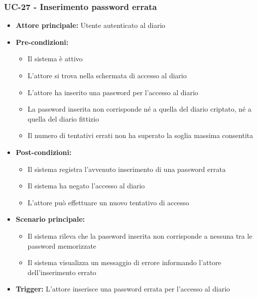 \documentclass[a4paper,12pt]{article}
\begin{document}
\subsubsection{UC-27 - Inserimento password errata} \label{subsec:UC-27}
\begin{itemize}
    \item \textbf{Attore principale:} Utente autenticato al diario
    \item \textbf{Pre-condizioni:}
    \begin{itemize}
        \item Il sistema è attivo
        \item L'attore si trova nella schermata di accesso al diario
        \item L'attore ha inserito una password per l'accesso al diario
        \item La password inserita non corrisponde né a quella del diario criptato, né a quella del diario fittizio
        \item Il numero di tentativi errati non ha superato la soglia massima consentita
    \end{itemize}
    \item \textbf{Post-condizioni:} 
    \begin{itemize}
        \item Il sistema registra l'avvenuto inserimento di una password errata
        \item Il sistema ha negato l'accesso al diario
        \item L'attore può effettuare un nuovo tentativo di accesso
    \end{itemize}
    \item \textbf{Scenario principale:} 
    \begin{itemize}
        \item Il sistema rileva che la password inserita non corrisponde a nessuna tra le password memorizzate
        \item Il sistema visualizza un messaggio di errore informando l'attore dell'inserimento errato
    \end{itemize}
    \item \textbf{Trigger:} L'attore inserisce una password errata per l'accesso al diario

\end{itemize}
\end{document}
